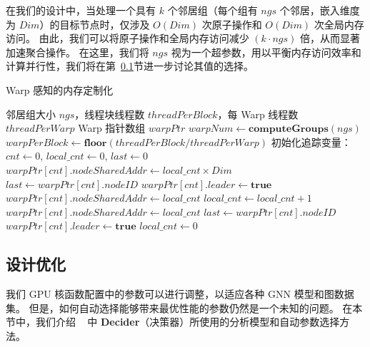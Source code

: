 在我们的设计中，当处理一个具有 $k$ 个邻居组（每个组有 $ngs$ 个邻居，嵌入维度为 $Dim$）的目标节点时，仅涉及 $O(Dim)$ 次原子操作和 $O(Dim)$ 次全局内存访问。
由此，我们可以将原子操作和全局内存访问减少 $(k\cdot ngs)$ 倍，从而显著加速聚合操作。
在这里，我们将 $ngs$ 视为一个超参数，用以平衡内存访问效率和计算并行性，我们将在第~\ref{sect: analytical modeling}节进一步讨论其值的选择。
\begin{algorithm}[htbp]
    \caption{Warp 感知的内存定制化}
    \label{alg: memory-organization}
    \begin{algorithmic}[1] \small
        \Require 邻居组大小 $\mathit{ngs}$，线程块线程数 $\mathit{threadPerBlock}$，每 Warp 线程数 $\mathit{threadPerWarp}$
        \Ensure Warp 指针数组 $\mathit{warpPtr}$
        \State $\mathit{warpNum} \gets \textbf{computeGroups}(\mathit{ngs})$ 
        \State $\mathit{warpPerBlock} \gets \textbf{floor}(\mathit{threadPerBlock} / \mathit{threadPerWarp})$ 
        \State 初始化追踪变量：$\mathit{cnt} \gets 0$, $\mathit{local\_cnt} \gets 0$, $\mathit{last} \gets 0$
             
                \State $\mathit{warpPtr[cnt].nodeSharedAddr} \gets \mathit{local\_cnt} \times \mathit{Dim}$
                \State $\mathit{last} \gets \mathit{warpPtr[cnt].nodeID}$
                \State $\mathit{warpPtr[cnt].leader} \gets \textbf{true}$
            \Else
                 
                    \State $\mathit{warpPtr[cnt].nodeSharedAddr} \gets \mathit{local\_cnt}$
                \Else {}
                    \State $\mathit{local\_cnt} \gets \mathit{local\_cnt} + 1$
                    \State $\mathit{warpPtr[cnt].nodeSharedAddr} \gets \mathit{local\_cnt}$
                    \State $\mathit{last} \gets \mathit{warpPtr[cnt].nodeID}$
                    \State $\mathit{warpPtr[cnt].leader} \gets \textbf{true}$
                \EndIf
            \EndIf
             
                \State $\mathit{local\_cnt} \gets 0$
            \EndIf
        \EndWhile
    \end{algorithmic}
\end{algorithm}
\subsection{设计优化}
\label{sect: analytical modeling}
\vspace{-5pt}
我们 GPU 核函数配置中的参数可以进行调整，以适应各种 GNN 模型和图数据集。
但是，如何自动选择能够带来最优性能的参数仍然是一个未知的问题。
在本节中，我们介绍 ~\Mname{} 中 \textbf{Decider}（决策器）所使用的分析模型和自动参数选择方法。

